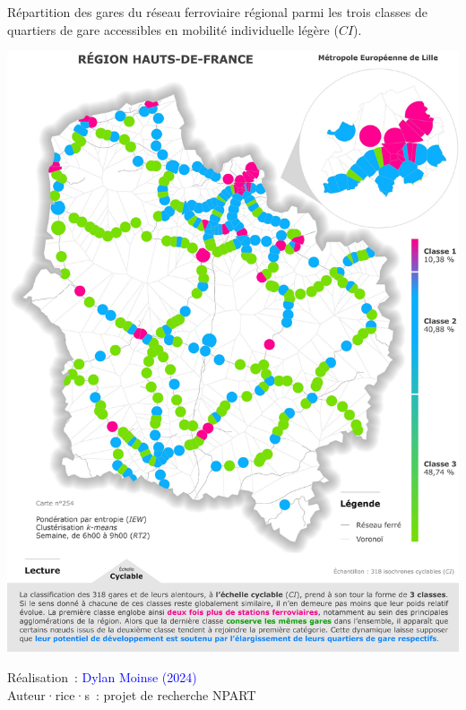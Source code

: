 \begin{refsegment}
    \begin{carte}[h!]\vspace*{4pt}
        \caption{Répartition des gares du réseau ferroviaire régional parmi les trois classes de quartiers de gare accessibles en mobilité individuelle légère (\(CI\)).}
        \label{fig-chap6:classification-gares-cyclable}
        \centerline{\includegraphics[width=1\columnwidth]{src/Figures/Chap-6/FR_NPART_Carte_Classification_CI.jpg}}
        \vspace{5pt}
        \begin{flushright}\scriptsize{
        Réalisation~: \textcolor{blue}{Dylan Moinse (2024)}
        \\
        Auteur·rice·s~: projet de recherche \acrshort{NPART}
        }\end{flushright}
    \end{carte}


\end{refsegment}
